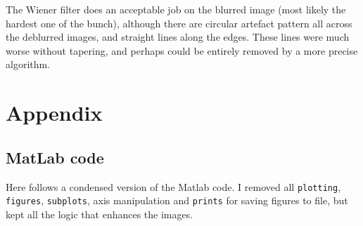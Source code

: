 \documentclass[a4paper]{article}
\begin{document}
The Wiener filter does an acceptable job on the blurred image (most likely the hardest one of the bunch), although there are circular artefact pattern all across the deblurred images, and straight lines along the edges. These lines were much worse without tapering, and perhaps could be entirely removed by a more precise algorithm.

\section*{Appendix}

\subsection*{MatLab code}
Here follows a condensed version of the Matlab code. I removed all \texttt{plotting}, \texttt{figures}, \texttt{subplots}, axis manipulation and \texttt{prints} for saving figures to file, but kept all the logic that enhances the images.
\end{document}

